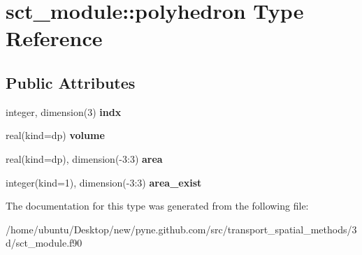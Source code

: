 \hypertarget{structsct__module_1_1polyhedron}{}\section{sct\+\_\+module\+:\+:polyhedron Type Reference}
\label{structsct__module_1_1polyhedron}
\subsection*{Public Attributes}
\begin{DoxyCompactItemize}
\item 
integer, dimension(3) {\bfseries indx}\hypertarget{structsct__module_1_1polyhedron_a0a9f5f4cc18647a9ebeb2318bc83dfa7}{}\label{structsct__module_1_1polyhedron_a0a9f5f4cc18647a9ebeb2318bc83dfa7}

\item 
real(kind=dp) {\bfseries volume}\hypertarget{structsct__module_1_1polyhedron_a20eae3d573880fd36935c35d3b1d6c75}{}\label{structsct__module_1_1polyhedron_a20eae3d573880fd36935c35d3b1d6c75}

\item 
real(kind=dp), dimension(-\/3\+:3) {\bfseries area}\hypertarget{structsct__module_1_1polyhedron_aa39269bf2d196995f86f0b365b7c46dd}{}\label{structsct__module_1_1polyhedron_aa39269bf2d196995f86f0b365b7c46dd}

\item 
integer(kind=1), dimension(-\/3\+:3) {\bfseries area\+\_\+exist}\hypertarget{structsct__module_1_1polyhedron_a4d8b6322e32640812e3c917645febc0b}{}\label{structsct__module_1_1polyhedron_a4d8b6322e32640812e3c917645febc0b}

\end{DoxyCompactItemize}


The documentation for this type was generated from the following file\+:\begin{DoxyCompactItemize}
\item 
/home/ubuntu/\+Desktop/new/pyne.\+github.\+com/src/transport\+\_\+spatial\+\_\+methods/3d/sct\+\_\+module.\+f90\end{DoxyCompactItemize}
